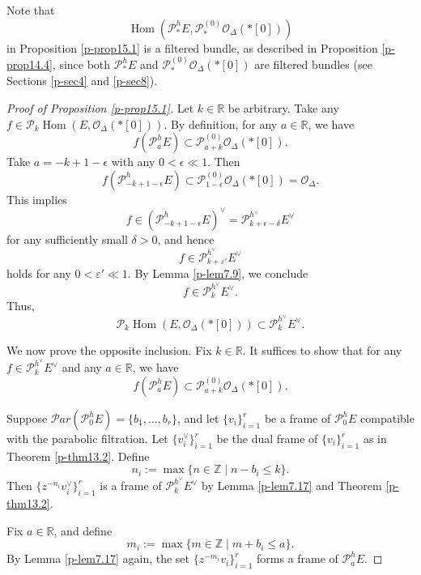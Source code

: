 \documentclass[12pt,twoside]{amsart}
\DeclareMathOperator{\Hom}{Hom}
\theoremstyle{definition}
\begin{document}
Note that 
\[
\Hom(\mathcal{P}^h_\ast E, \mathcal{P}^{(0)}_{\ast} \mathcal{O}_\Delta(*[0]))
\]
in Proposition \ref{p-prop15.1} 
is a filtered bundle, as described in Proposition \ref{p-prop14.4}, 
since both \( \mathcal{P}^h_\ast E \) and 
\( \mathcal{P}^{(0)}_\ast \mathcal{O}_\Delta(*[0]) \) 
are filtered bundles (see Sections \ref{p-sec4} and \ref{p-sec8}).

\begin{proof}[Proof of Proposition \ref{p-prop15.1}]
Let \( k \in \mathbb{R} \) be arbitrary. Take any 
\( f \in \mathcal{P}_k \Hom(E, \mathcal{O}_\Delta(*[0])) \). 
By definition, for any \( a \in \mathbb{R} \), we have
\[
f(\mathcal{P}^h_a E) \subset \mathcal{P}^{(0)}_{a + k} \mathcal{O}_\Delta(*[0]).
\]
Take \( a = -k + 1 - \epsilon \) with any \( 0 < \epsilon \ll 1 \). Then
\[
f(\mathcal{P}^h_{-k + 1 - \epsilon} E) \subset 
\mathcal{P}^{(0)}_{1 - \epsilon} \mathcal{O}_\Delta(*[0]) = \mathcal{O}_\Delta.
\]
This implies
\[
f \in (\mathcal{P}^h_{-k + 1 - \epsilon} E)^\vee 
= \mathcal{P}^{h^\vee}_{k + \epsilon - \delta} E^\vee
\]
for any sufficiently small \( \delta > 0 \), and hence
\[
f \in \mathcal{P}^{h^\vee}_{k + \varepsilon'} E^\vee
\] 
holds for any $0<\varepsilon '\ll 1$. 
By Lemma \ref{p-lem7.9}, we conclude
\[
f \in \mathcal{P}^{h^\vee}_k E^\vee.
\]
Thus,
\[
\mathcal{P}_k \Hom(E, \mathcal{O}_\Delta(*[0])) 
\subset \mathcal{P}^{h^\vee}_k E^\vee.
\]

We now prove the opposite inclusion. Fix \( k \in \mathbb{R} \).  
It suffices to show that for 
any \( f \in \mathcal{P}^{h^\vee}_k E^\vee \) and any \( a \in \mathbb{R} \), we have
\[
f(\mathcal{P}^h_a E) \subset \mathcal{P}^{(0)}_{a + k} \mathcal{O}_\Delta(*[0]).
\]

Suppose \( \mathcal{P}ar(\mathcal{P}^h_0 E) = \{b_1, \dots, b_r\} \),  
and let \( \{v_i\}_{i=1}^r \) be a 
frame of \( \mathcal{P}^h_0 E \) compatible with the parabolic filtration.  
Let \( \{v_i^\vee\}_{i=1}^r \) be the dual frame of \( \{v_i\}_{i=1}^r \) 
as in Theorem \ref{p-thm13.2}.  
Define
\[
n_i := \max \{ n \in \mathbb{Z} \mid n - b_i \leq k \}.
\]
Then \( \{ z^{-n_i} v_i^\vee \}_{i=1}^r \) is 
a frame of \( \mathcal{P}^{h^\vee}_k E^\vee \) 
by Lemma \ref{p-lem7.17} and Theorem \ref{p-thm13.2}.

Fix \( a \in \mathbb{R} \), and define
\[
m_i := \max \{ m \in \mathbb{Z} \mid m + b_i \leq a \}.
\]
By Lemma \ref{p-lem7.17} again, the 
set \( \{ z^{-m_i} v_i \}_{i=1}^r \) forms a frame of \( \mathcal{P}^h_a E \).


\end{proof}
\end{document}
